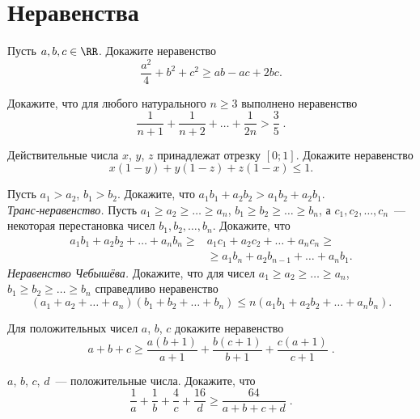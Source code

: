 

\section*{Неравенства}


\begin{problems}

\item
Пусть $a, b, c \in \RR$.
Докажите неравенство
\[
    \frac{a^2}{4} + b^2 + c^2
\geq
    a b - a c + 2 b c
.\]

\item
Докажите, что для любого натурального $n \geq 3$ выполнено неравенство
\[
    \frac{1}{n + 1} + \frac{1}{n + 2} + \ldots + \frac{1}{2 n}
>
    \frac{3}{5}
\;.\]

\item
Действительные числа $x$, $y$, $z$ принадлежат отрезку $[0; 1]$.
Докажите неравенство
\[
    x (1 - y) + y (1 - z) + z (1 - x)
\leq
    1
.\]

\item
\sbp
Пусть $a_1 > a_2$, $b_1 > b_2$.
Докажите, что $a_1 b_1 + a_2 b_2 > a_1 b_2 + a_2 b_1$.
\\
\sbp\emph{Транс-неравенство.}
Пусть
$a_1 \geq a_2 \geq \ldots \geq a_n$,
$b_1 \geq b_2 \geq \ldots \geq b_n$, а
$c_1, c_2, \ldots, c_n$~--- некоторая перестановка чисел
$b_1, b_2, \ldots, b_n$.
Докажите, что
\begin{align*}
    a_1 b_1 + a_2 b_2 + \ldots + a_n b_n
\geq{}&
    a_1 c_1 + a_2 c_2 + \ldots + a_n c_n
\geq\\&{}\geq
    a_1 b_n + a_2 b_{n-1} + \ldots + a_n b_1
.\end{align*}
\sbp\emph{Неравенство Чебышёва.}
Докажите, что для чисел
$a_1 \geq a_2 \geq \ldots \geq a_n$,
$b_1 \geq b_2 \geq \ldots \geq b_n$
справедливо неравенство
\[
    (a_1 + a_2 + \ldots + a_n) (b_1 + b_2 + \ldots + b_n)
\leq
    n (a_1 b_1 + a_2 b_2 + \ldots + a_n b_n)
.\]

\item
Для положительных чисел $a$, $b$, $c$ докажите неравенство
\[
    a + b + c
\geq
    \frac{a (b + 1)}{a + 1} +
    \frac{b (c + 1)}{b + 1} +
    \frac{c (a + 1)}{c + 1}
\;.\]

\item
$a$, $b$, $c$, $d$~--- положительные числа.
Докажите, что
\[
    \frac{1}{a} + \frac{1}{b} + \frac{4}{c} + \frac{16}{d}
\geq
    \frac{64}{a + b + c + d}
\;.\]


\end{problems}
